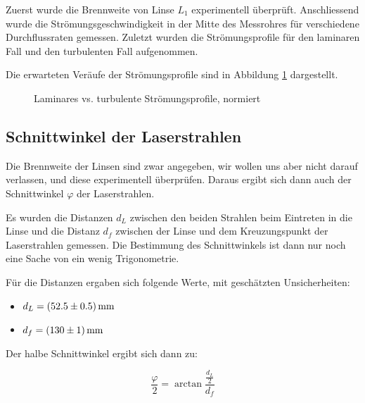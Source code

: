 Zuerst    wurde    die    Brennweite    von    Linse    $L_1$    experimentell
\"uberpr\"uft. Anschliessend wurde die Str\"omungsgeschwindigkeit in der Mitte
des  Messrohres f\"ur  verschiedene  Durchflussraten gemessen. Zuletzt  wurden
die  Str\"omungsprofile f\"ur  den  laminaren Fall  und  den turbulenten  Fall
aufgenommen.

Die   erwarteten   Ver\"aufe   der  Str\"omungsprofile   sind   in   Abbildung
\ref{fig:laminarVsturbulent} dargestellt.

\begin{figure}[h!t]
    \centering
    \resizebox{.9\textwidth}{!}{}
    \caption{Laminares vs. turbulente Str\"omungsprofile, normiert}
    \label{fig:laminarVsturbulent}
\end{figure}


\clearpage
\subsection{Schnittwinkel der Laserstrahlen}
\label{subsec:varphi}

Die Brennweite der Linsen sind zwar angegeben, wir wollen uns aber nicht darauf
verlassen, und diese experimentell \"uberpr\"ufen. Daraus ergibt sich dann auch
der Schnittwinkel $\varphi$ der Laserstrahlen.

 Es wurden die Distanzen $d_L$ zwischen  den beiden Strahlen beim Eintreten in
die Linse und die Distanz $d_f$  zwischen der Linse und dem Kreuzungspunkt der
Laserstrahlen gemessen. Die  Bestimmung des  Schnittwinkels ist dann  nur noch
eine Sache von ein wenig Trigonometrie.

F\"ur   die  Distanzen   ergaben  sich   folgende  Werte,   mit  gesch\"atzten
Unsicherheiten:

\begin{itemize}
    \item
        $ d_L = \SI{52.5 \pm 0.5}{\milli\meter}$
    \item
        $ d_f = \SI{130 \pm 1}{\milli\meter}$
\end{itemize}

Der halbe Schnittwinkel ergibt sich dann zu:

\begin{equation}
    \label{eq:varphi_half}
    \frac{\varphi}{2} = \arctan \frac{\frac{d_L}{2}}{d_f}
\end{equation}

